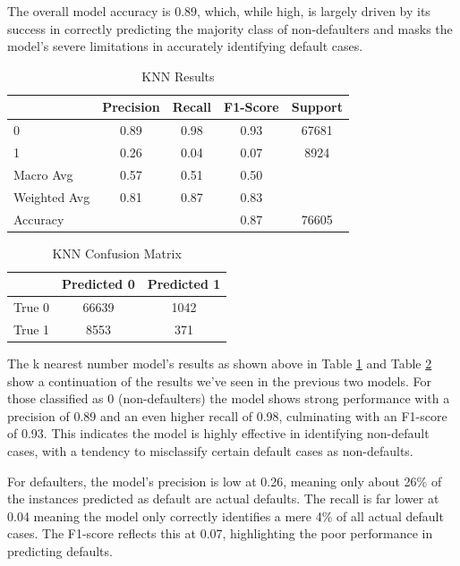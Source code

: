 \documentclass[12pt]{article}
\begin{document}
The overall model accuracy is 0.89, which, while high, is largely driven by its success in correctly predicting the majority class of non-defaulters and masks the model's severe limitations in accurately identifying default cases.

\begin{table}[htbp]
    \centering
    \caption{KNN Results}
    \begin{tabular}{lcccc}
        \toprule
        & Precision & Recall & F1-Score & Support \\
        \midrule
        0 & 0.89 & 0.98 & 0.93 & 67681 \\
        1 & 0.26 & 0.04 & 0.07 & 8924 \\
        Macro Avg & 0.57 & 0.51 & 0.50 & \\
        Weighted Avg & 0.81 & 0.87 & 0.83 & \\
        \midrule
        Accuracy & & & 0.87 & 76605 \\
        \bottomrule
    \end{tabular}
    \label{table:kNNResults}
\end{table}

\begin{table}[htbp]
    \centering
    \caption{KNN Confusion Matrix}
    \begin{tabular}{lcc}
        \toprule
        & Predicted 0 & Predicted 1 \\
        \midrule
        True 0 & 66639 & 1042 \\
        True 1 & 8553 & 371 \\
        \bottomrule
    \end{tabular}
    \label{table:kNNConfusionMatrix}
\end{table}

The k nearest number model's results as shown above in Table \ref{table:kNNResults} and Table \ref{table:kNNConfusionMatrix} show a continuation of the results we've seen in the previous two models. For those classified as 0 (non-defaulters) the model shows strong performance with a precision of 0.89 and an even higher recall of 0.98, culminating with an F1-score of 0.93. This indicates the model is highly effective in identifying non-default cases, with a tendency to misclassify certain default cases as non-defaults.

For defaulters, the model's precision is low at 0.26, meaning only about 26\% of the instances predicted as default are actual defaults. The recall is far lower at 0.04 meaning the model only correctly identifies a mere 4\% of all actual default cases. The F1-score reflects this at 0.07, highlighting the poor performance in predicting defaults.
\end{document}

